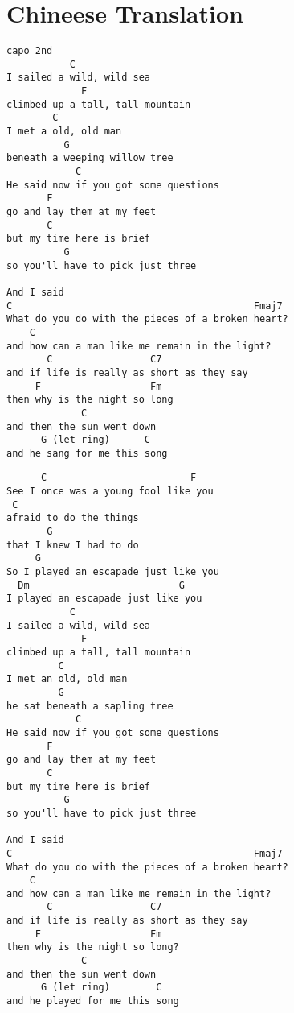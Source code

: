 \documentclass[leqno]{memoir}
\begin{document}
\chapter{Chineese Translation}
\begin{verbatim}
capo 2nd
           C
I sailed a wild, wild sea
             F
climbed up a tall, tall mountain
        C
I met a old, old man
          G
beneath a weeping willow tree
            C
He said now if you got some questions
       F
go and lay them at my feet
       C
but my time here is brief
          G
so you'll have to pick just three

And I said
C                                          Fmaj7
What do you do with the pieces of a broken heart?
    C
and how can a man like me remain in the light?
       C                 C7
and if life is really as short as they say
     F                   Fm
then why is the night so long
             C
and then the sun went down
      G (let ring)      C
and he sang for me this song
\end{verbatim}
\newpage
\begin{verbatim}
      C                         F
See I once was a young fool like you
 C
afraid to do the things
       G
that I knew I had to do
     G
So I played an escapade just like you
  Dm                          G
I played an escapade just like you
           C
I sailed a wild, wild sea
             F
climbed up a tall, tall mountain
         C
I met an old, old man
         G
he sat beneath a sapling tree
            C
He said now if you got some questions
       F
go and lay them at my feet
       C
but my time here is brief
          G
so you'll have to pick just three

And I said
C                                          Fmaj7
What do you do with the pieces of a broken heart?
    C
and how can a man like me remain in the light?
       C                 C7
and if life is really as short as they say
     F                   Fm
then why is the night so long?
             C
and then the sun went down
      G (let ring)        C
and he played for me this song
\end{verbatim}
\newpage
\end{document}
